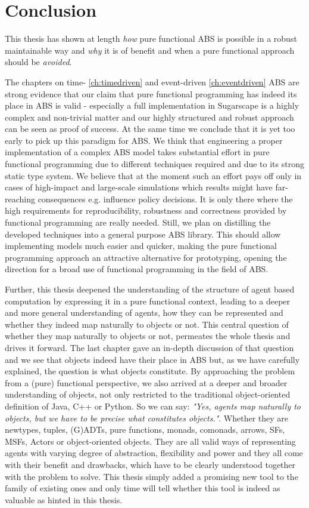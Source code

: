 \chapter{Conclusion}
\label{ch:conclusion}
This thesis has shown at length \textit{how} pure functional ABS is possible in a robust maintainable way and \textit{why} it is of benefit and when a pure functional approach should be \textit{avoided}.

The chapters on time- \ref{ch:timedriven} and event-driven \ref{ch:eventdriven} ABS are strong evidence that our claim that pure functional programming has indeed its place in ABS is valid - especially a full implementation in Sugarscape is a highly complex and non-trivial matter and our highly structured and robust approach can be seen as proof of success. At the same time we conclude that it is yet too early to pick up this paradigm for ABS. We think that engineering a proper implementation of a complex ABS model takes substantial effort in pure functional programming due to different techniques required and due to its strong static type system. We believe that at the moment such an effort pays off only in cases of high-impact and large-scale simulations which results might have far-reaching consequences e.g. influence policy decisions. It is only there where the high requirements for reproducibility, robustness and correctness provided by functional programming are really needed. Still, we plan on distilling the developed techniques into a general purpose ABS library. This should allow implementing models much easier and quicker, making the pure functional programming approach an attractive alternative for prototyping, opening the direction for a broad use of functional programming in the field of ABS.

Further, this thesis deepened the understanding of the structure of agent based computation by expressing it in a pure functional context, leading to a deeper and more general understanding of agents, how they can be represented and whether they indeed map naturally to objects or not. This central question of whether they map naturally to objects or not, permeates the whole thesis and drives it forward. The last chapter gave an in-depth discussion of that question and we see that objects indeed have their place in ABS but, as we have carefully explained, the question is what objects constitute. By approaching the problem from a (pure) functional perspective, we also arrived at a deeper and broader understanding of objects, not only restricted to the traditional object-oriented definition of Java, C++ or Python. So we can say: \textit{"Yes, agents map naturally to objects, but we have to be precise what constitutes objects."}. Whether they are newtypes, tuples, (G)ADTs, pure functions, monads, comonads, arrows, SFs, MSFs, Actors or object-oriented objects. They are all valid ways of representing agents with varying degree of abstraction, flexibility and power and they all come with their benefit and drawbacks, which have to be clearly understood together with the problem to solve. This thesis simply added a promising new tool to the family of existing ones and only time will tell whether this tool is indeed as valuable as hinted in this thesis.

